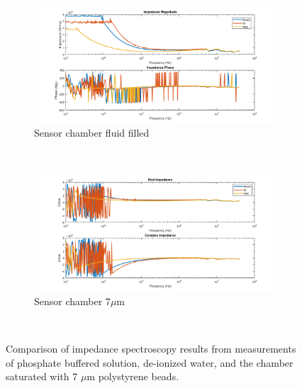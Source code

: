 \begin{figure}[h]
    \centering
    \begin{subfigure}[b]{\textwidth}
        \centering
        \includegraphics[width=\textwidth]{images/raw_IS_data_mag_phase.png}
        \caption{Sensor chamber fluid filled}
    \end{subfigure}
    \\
    \vspace{0.1 in}
    \begin{subfigure}[b]{\textwidth}
        \centering
        \includegraphics[width=\textwidth]{images/raw_IS_data_real_imag.png}
        \caption{Sensor chamber 7$\mu$m }
    \end{subfigure}
    \\
    \caption[PBS, DI, microbead IS data comparison.]{Comparison of impedance spectroscopy results from measurements of phosphate buffered solution, de-ionized water, and the chamber saturated with 7 $\mu$m polystyrene beads.}
    \label{fig:IS_data_beads_pbs_DI_comp}
\end{figure}

